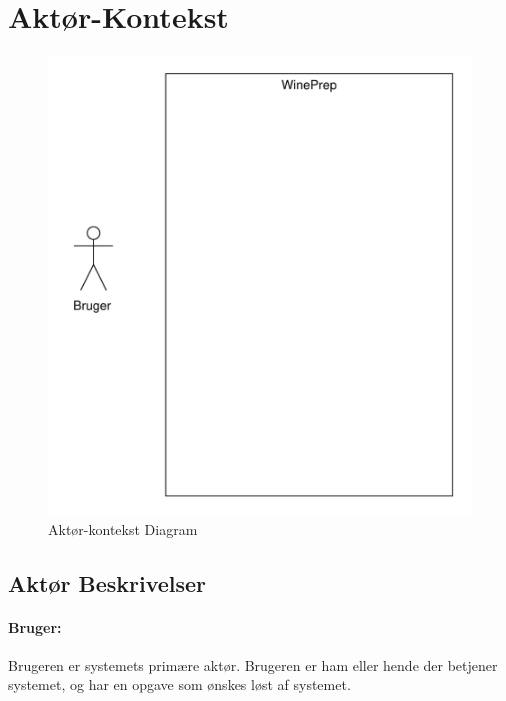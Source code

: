 \section{Aktør-Kontekst}

\begin{figure}[H]

\centering
\includegraphics[scale=0.5]{aktkontekstdiagram}

\caption[Figur]{Aktør-kontekst Diagram}
\label{aktkondiagram}
\end{figure}

\subsection{Aktør Beskrivelser}

\paragraph{Bruger:} Brugeren er systemets primære aktør. Brugeren er ham eller hende der betjener systemet, og har en opgave som ønskes løst af systemet.